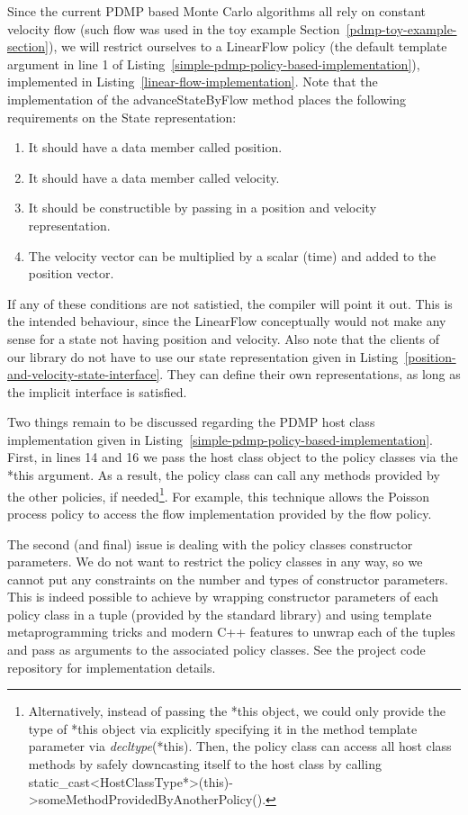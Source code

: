 \documentclass[report.tex]{subfiles}
\begin{document}
Since the current PDMP based Monte Carlo algorithms all rely on constant velocity
flow (such flow was used in the toy example Section~\ref{pdmp-toy-example-section}), we
will restrict ourselves to a LinearFlow policy (the default template argument in line 1
of Listing~\ref{simple-pdmp-policy-based-implementation}), implemented in
Listing~\ref{linear-flow-implementation}.
Note that the implementation of the advanceStateByFlow method places the following
requirements on the State representation:
\begin{enumerate}
  \item It should have a data member called position.
  \item It should have a data member called velocity.
  \item It should be constructible by passing in a position and velocity representation.
  \item The velocity vector can be multiplied by a scalar (time) and added to the position vector.
\end{enumerate}
If any of these conditions are not satistied, the compiler will point it out. This is the
intended behaviour, since the LinearFlow conceptually would not make any sense for
a state not having position and velocity.
Also note that the clients of our library do not have to use our state representation
given in Listing~\ref{position-and-velocity-state-interface}.
They can define their own representations, as long as the implicit interface is satisfied.


Two things remain to be discussed regarding the PDMP host class implementation given
in Listing~\ref{simple-pdmp-policy-based-implementation}.
First, in lines 14 and 16 we pass the host class object to the policy classes
via the *this argument. As a result, the policy class can call any methods provided
by the other policies, if needed\footnote{
  Alternatively, instead of passing the *this object, we could only provide the type
  of *this object via explicitly specifying it in the method template
  parameter via \textit{decltype}(*this).
  Then, the policy class can access all host class methods by safely downcasting itself
  to the host class by calling static\_cast<HostClassType*>(this)->someMethodProvidedByAnotherPolicy().
}. For example, this technique allows the Poisson process
policy to access the flow implementation provided by the flow policy.

The second (and final) issue is dealing with the policy classes constructor parameters.
We do not want to restrict the policy classes in any way, so we cannot put any constraints
on the number and types of constructor parameters.
This is indeed possible to achieve by wrapping constructor parameters of each
policy class in a tuple (provided by the standard library)
and using template metaprogramming tricks and modern C++ features to unwrap
each of the tuples and pass as arguments to the associated policy classes.
See the project code repository for implementation details.
\end{document}
